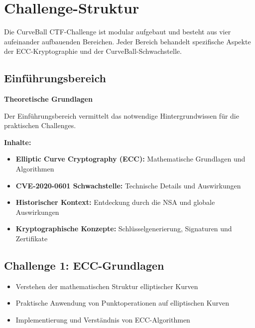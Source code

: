 \documentclass{article}
\begin{document}
\clearpage

\section{Challenge-Struktur}

Die CurveBall CTF-Challenge ist modular aufgebaut und besteht aus vier aufeinander aufbauenden Bereichen. Jeder Bereich behandelt spezifische Aspekte der ECC-Kryptographie und der CurveBall-Schwachstelle.

\vspace{0.5cm}

\subsection{Einführungsbereich}

\begin{infobox}
\textbf{Theoretische Grundlagen}

Der Einführungsbereich vermittelt das notwendige Hintergrundwissen für die praktischen Challenges.
\end{infobox}

\textbf{Inhalte:}
\begin{itemize}[leftmargin=1.5cm]
    \item \textbf{Elliptic Curve Cryptography (ECC):} Mathematische Grundlagen und Algorithmen
    \item \textbf{CVE-2020-0601 Schwachstelle:} Technische Details und Auswirkungen
    \item \textbf{Historischer Kontext:} Entdeckung durch die NSA und globale Auswirkungen
    \item \textbf{Kryptographische Konzepte:} Schlüsselgenerierung, Signaturen und Zertifikate
\end{itemize}

\vspace{0.8cm}

\subsection{Challenge 1: ECC-Grundlagen}

\begin{tcolorbox}[colback=thd-blue!10,colframe=thd-blue,title=\textbf{Lernziele}]
\begin{itemize}[leftmargin=1cm]
    \item Verstehen der mathematischen Struktur elliptischer Kurven
    \item Praktische Anwendung von Punktoperationen auf elliptischen Kurven
    \item Implementierung und Verständnis von ECC-Algorithmen
\end{itemize}
\end{tcolorbox}
\end{document}
